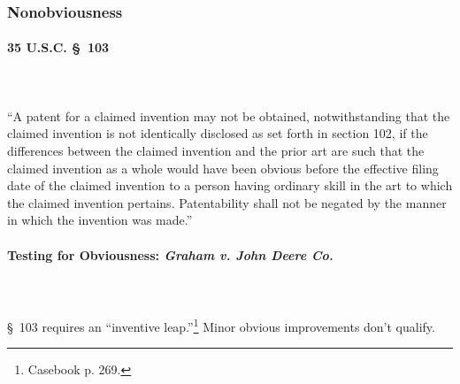 \subsubsection{Nonobviousness}

\paragraph{35 U.S.C. \S\ 103}
~\\\\
``A patent for a claimed invention may not be obtained, notwithstanding that the 
claimed invention is not identically disclosed as set forth in section 102, if 
the differences between the claimed invention and the prior art are such that 
the claimed invention as a whole would have been obvious before the effective 
filing date of the claimed invention to a person having ordinary skill in the 
art to which the claimed invention pertains. Patentability shall not be negated 
by the manner in which the invention was made.''

\paragraph{Testing for Obviousness: \emph{Graham v. John Deere Co.}}
~\\\\
\S\ 103 requires an ``inventive leap.''\footnote{Casebook p. 269.} Minor obvious 
improvements don't qualify.

